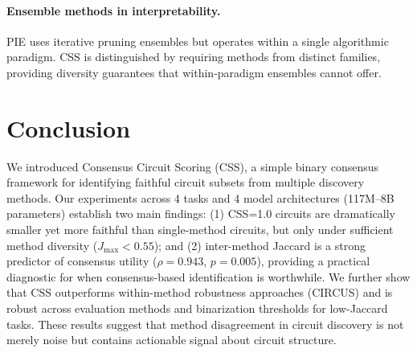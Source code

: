 \documentclass[11pt]{article}
\newcommand{\css}{\textsc{CSS}}
\newcommand{\cssone}{\textsc{CSS}{=}1.0}
\begin{document}
\paragraph{Ensemble methods in interpretability.} PIE \citep{zhang2024pie} uses iterative pruning ensembles but operates within a single algorithmic paradigm. \css{} is distinguished by requiring methods from distinct families, providing diversity guarantees that within-paradigm ensembles cannot offer.

\section{Conclusion}
\label{sec:conclusion}

We introduced Consensus Circuit Scoring (\css{}), a simple binary consensus framework for identifying faithful circuit subsets from multiple discovery methods. Our experiments across 4 tasks and 4 model architectures (117M--8B parameters) establish two main findings: (1) \cssone{} circuits are dramatically smaller yet more faithful than single-method circuits, but only under sufficient method diversity ($J_{\max} < 0.55$); and (2) inter-method Jaccard is a strong predictor of consensus utility ($\rho = 0.943$, $p = 0.005$), providing a practical diagnostic for when consensus-based identification is worthwhile. We further show that \css{} outperforms within-method robustness approaches (CIRCUS) and is robust across evaluation methods and binarization thresholds for low-Jaccard tasks. These results suggest that method disagreement in circuit discovery is not merely noise but contains actionable signal about circuit structure.



\end{document}
